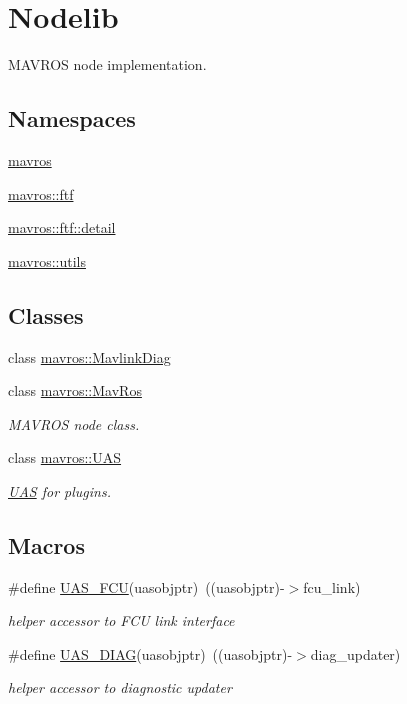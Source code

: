 \hypertarget{group__nodelib}{}\section{Nodelib}
\label{group__nodelib}


M\+A\+V\+R\+OS node implementation.  


\subsection*{Namespaces}
\begin{DoxyCompactItemize}
\item 
 \mbox{\hyperlink{namespacemavros}{mavros}}
\item 
 \mbox{\hyperlink{namespacemavros_1_1ftf}{mavros\+::ftf}}
\item 
 \mbox{\hyperlink{namespacemavros_1_1ftf_1_1detail}{mavros\+::ftf\+::detail}}
\item 
 \mbox{\hyperlink{namespacemavros_1_1utils}{mavros\+::utils}}
\end{DoxyCompactItemize}
\subsection*{Classes}
\begin{DoxyCompactItemize}
\item 
class \mbox{\hyperlink{classmavros_1_1MavlinkDiag}{mavros\+::\+Mavlink\+Diag}}
\item 
class \mbox{\hyperlink{classmavros_1_1MavRos}{mavros\+::\+Mav\+Ros}}
\begin{DoxyCompactList}\small\item\em M\+A\+V\+R\+OS node class. \end{DoxyCompactList}\item 
class \mbox{\hyperlink{classmavros_1_1UAS}{mavros\+::\+U\+AS}}
\begin{DoxyCompactList}\small\item\em \mbox{\hyperlink{classmavros_1_1UAS}{U\+AS}} for plugins. \end{DoxyCompactList}\end{DoxyCompactItemize}
\subsection*{Macros}
\begin{DoxyCompactItemize}
\item 
\#define \mbox{\hyperlink{group__nodelib_ga5c6dea8a8974af64cc76329a179a014d}{U\+A\+S\+\_\+\+F\+CU}}(uasobjptr)~((uasobjptr)-\/$>$fcu\+\_\+link)
\begin{DoxyCompactList}\small\item\em helper accessor to F\+CU link interface \end{DoxyCompactList}\item 
\#define \mbox{\hyperlink{group__nodelib_ga51a676b860891367c27584276967f1d4}{U\+A\+S\+\_\+\+D\+I\+AG}}(uasobjptr)~((uasobjptr)-\/$>$diag\+\_\+updater)
\begin{DoxyCompactList}\small\item\em helper accessor to diagnostic updater \end{DoxyCompactList}\end{DoxyCompactItemize}
